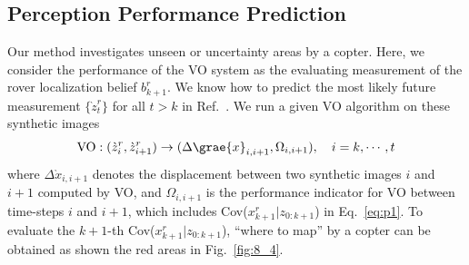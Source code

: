 \documentclass[conference]{IEEEtran}
\begin{document}
\subsection{Perception Performance Prediction}
Our method investigates unseen or uncertainty areas by a copter. 
Here, we consider the performance of the VO system as the evaluating measurement of the rover localization belief $b^r_{k+1}$. We know how to predict the most likely future measurement $\{ \grave{z}^r_t \}$ for all $t>k$ in Ref.~\cite{IEEE:Kyon}. We run a given VO algorithm on these synthetic images
\begin{align}
    {\rm VO}: (\grave{z}^r_i,\grave{z}^r_{i+1}) \to (\Delta \grae{x}_{i,i+1},\Omega_{i,i+1}),\quad i=k,\cdots,t
\end{align}
where $\Delta \grave{x}_{i,i+1}$ denotes the displacement between two synthetic images $i$ and $i+1$ computed by VO, and $\Omega_{i,i+1}$ is the performance indicator for VO between time-steps $i$ and $i+1$, which includes Cov($x^{r}_{k+1} | z_{0:k+1}$) in Eq.~\eqref{eq:p1}. To evaluate the $k+1$-th Cov($x^{r}_{k+1} | z_{0:k+1}$), ``where to map'' by a copter can be obtained as shown the red areas in Fig.~\ref{fig:8_4}.

\end{document}
